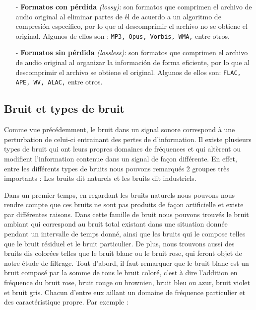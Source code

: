\documentclass[conference,onecolumn]{IEEEtran}
\begin{document}
\begin{itemize} %

    \item[-] \textbf{Formatos con pérdida} \textit{(lossy)}: son formatos que comprimen el archivo de audio original al eliminar partes de él de acuerdo a un algoritmo de compresión específico, por lo que al descomprimir el archivo no se obtiene el original. Algunos de ellos son : \texttt{MP3, Opus, Vorbis, WMA,} entre otros.
    \item[-] \textbf{Formatos sin pérdida} \textit{(lossless)}: son formatos que comprimen el archivo de audio original al organizar la información de forma eficiente, por lo que al descomprimir el archivo se obtiene el original. Algunos de ellos son: \texttt{FLAC, APE, WV, ALAC,} entre otros.

\end{itemize}

\subsection{Bruit et types de bruit}
Comme vue précédemment, le bruit dans un signal sonore correspond à une perturbation de celui-ci entrainant des pertes de d’information. Il existe plusieurs types de bruit qui ont leurs propres domaines de fréquences et qui altèrent ou modifient l’information contenue dans un signal de façon différente. En effet, entre les différents types de bruits nous pouvons remarqués 2 groupes très importants : Les bruits dit naturels et les bruits dit industriels.  

Dans un premier temps, en regardant les bruits naturels nous pouvons nous rendre compte que ces bruits ne sont pas produits de façon artificielle et existe par différentes raisons. Dans cette famille de bruit nous pouvons trouvés le bruit ambiant qui correspond au bruit total existant dans une situation donnée pendant un intervalle de temps donné, ainsi que les bruits qui le compose telles que le bruit résiduel et le bruit particulier. De plus, nous trouvons aussi des bruits dis colorées telles que le bruit blanc ou le bruit rose, qui feront objet de notre étude de filtrage. Tout d’abord, il faut remarquer que le bruit blanc est un bruit composé par la somme de tous le bruit coloré, c’est à dire l’addition en fréquence du bruit rose, bruit rouge ou brownien, bruit bleu ou azur, bruit violet et bruit gris. Chacun d’entre eux aillant un domaine de fréquence particulier et des caractéristique propre. Par exemple :\\
\end{document}
